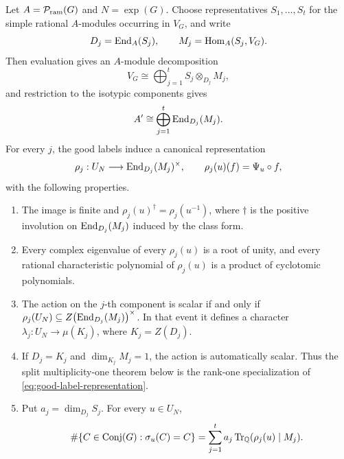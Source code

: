 \begin{theorem}
\label{thm:multiplicity-good-labels}
Let \(A=\mathcal P_{\mathrm{ram}}(G)\) and \(N=\exp(G)\).  Choose representatives
\(S_1,\ldots,S_t\) for the simple rational \(A\)-modules occurring in
\(V_G\), and write
\[
 D_j=\operatorname{End}_A(S_j),\qquad
 M_j=\operatorname{Hom}_A(S_j,V_G).
\]
Then evaluation gives an \(A\)-module decomposition
\begin{equation}
 V_G\cong\bigoplus_{j=1}^t S_j\otimes_{D_j}M_j,
 \label{eq:double-centralizer-decomposition}
\end{equation}
and restriction to the isotypic components gives
\begin{equation}
 A'\cong\bigoplus_{j=1}^t\operatorname{End}_{D_j}(M_j).
 \label{eq:double-centralizer-commutant}
\end{equation}
For every \(j\), the good labels induce a canonical representation
\begin{equation}
 \rho_j:U_N\longrightarrow
 \operatorname{End}_{D_j}(M_j)^\times,\qquad
 \rho_j(u)(f)=\Psi_u\circ f ,
 \label{eq:good-label-representation}
\end{equation}
with the following properties.
\begin{enumerate}
\item The image is finite and
  \(\rho_j(u)^\dagger=\rho_j(u^{-1})\), where \(\dagger\) is the positive
  involution on \(\operatorname{End}_{D_j}(M_j)\) induced by the class form.
\item Every complex eigenvalue of every \(\rho_j(u)\) is a root of unity,
  and every rational characteristic polynomial of \(\rho_j(u)\) is a
  product of cyclotomic polynomials.
\item The action on the \(j\)-th component is scalar if and only if
  \(\rho_j(U_N)\subseteq Z\bigl(\operatorname{End}_{D_j}(M_j)\bigr)^\times\).
  In that event it defines a character
  \(\lambda_j:U_N\to\mu(K_j)\), where \(K_j=Z(D_j)\).
\item If \(D_j=K_j\) and \(\dim_{K_j}M_j=1\), the action is automatically
  scalar.  Thus the split multiplicity-one theorem below is the rank-one
  specialization of \eqref{eq:good-label-representation}.
\item Put \(a_j=\dim_{D_j}S_j\).  For every \(u\in U_N\),
  \begin{equation}
  \#\{C\in\operatorname{Conj}(G):\sigma_u(C)=C\}
  = \sum_{j=1}^t a_j \operatorname{Tr}_\mathbb Q(\rho_j(u)\mid M_j).
  \label{eq:general-lefschetz}
  \end{equation}
\end{enumerate}
\end{theorem}

